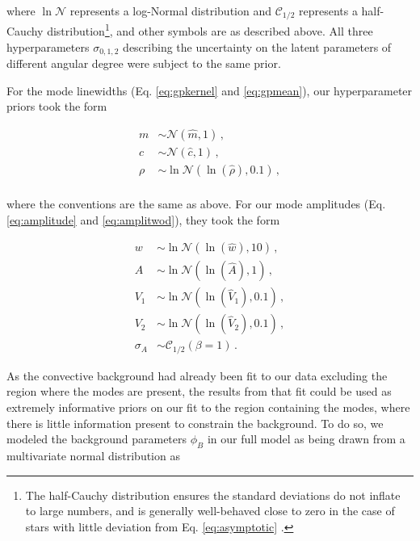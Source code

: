 \documentclass[12pt]{article}
\begin{document}
\noindent where $\ln\mathcal{N}$ represents a log-Normal distribution and $\mathcal{C}_{1/2}$ represents a half-Cauchy distribution\footnote{The half-Cauchy distribution ensures the standard deviations do not inflate to large numbers, and is generally well-behaved close to zero in the case of stars with little deviation from Eq. \ref{eq:asymptotic} \cite{gelman2006}.}, and other symbols are as described above. All three hyperparameters $\sigma_{0,1,2}$ describing the uncertainty on the latent parameters of different angular degree were subject to the same prior.

For the mode linewidths (Eq. \ref{eq:gpkernel} and \ref{eq:gpmean}), our hyperparameter priors took the form

\begin{equation}
	\begin{split}
		m &\sim \mathcal{N}(\hat{m}, 1)\, ,\\
		c &\sim \mathcal{N}(\hat{c}, 1)\, ,\\
		\rho &\sim \ln\mathcal{N}(\ln(\hat{\rho}), 0.1)\, ,\\
	\end{split}
\end{equation}

\noindent where the conventions are the same as above. For our mode amplitudes (Eq. \ref{eq:amplitude} and \ref{eq:amplitwod}), they took the form

\begin{equation}
	\begin{split}
		w &\sim \ln\mathcal{N}(\ln(\hat{w}), 10)\, ,\\
		A &\sim \ln\mathcal{N}(\ln(\hat{A}), 1)\, ,\\
		V_1 &\sim \ln\mathcal{N}(\ln(\hat{V}_1), 0.1)\, ,\\
		V_2 &\sim \ln\mathcal{N}(\ln(\hat{V}_2), 0.1)\, ,\\
		\sigma_A &\sim \mathcal{C}_{1/2}(\beta = 1)\, .
	\end{split}
\end{equation}

As the convective background had already been fit to our data excluding the region where the modes are present, the results from that fit could be used as extremely informative priors on our fit to the region containing the modes, where there is little information present to constrain the background. To do so, we modeled the background parameters $\phi_B$ in our full model as being drawn from a multivariate normal distribution as
\end{document}
